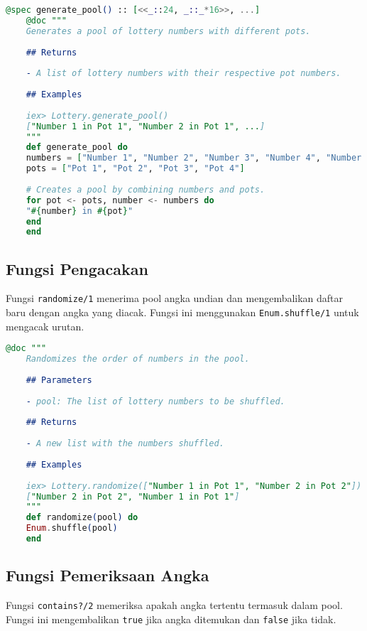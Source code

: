 \begin{lstlisting}[language=elixir, caption={Fungsi Pembentukan Pool}]
	@spec generate_pool() :: [<<_::24, _::_*16>>, ...]
	@doc """
	Generates a pool of lottery numbers with different pots.
	
	## Returns
	
	- A list of lottery numbers with their respective pot numbers.
	
	## Examples
	
	iex> Lottery.generate_pool()
	["Number 1 in Pot 1", "Number 2 in Pot 1", ...]
	"""
	def generate_pool do
	numbers = ["Number 1", "Number 2", "Number 3", "Number 4", "Number 5", "Number 6"]
	pots = ["Pot 1", "Pot 2", "Pot 3", "Pot 4"]
	
	# Creates a pool by combining numbers and pots.
	for pot <- pots, number <- numbers do
	"#{number} in #{pot}"
	end
	end
\end{lstlisting}

\subsection{Fungsi Pengacakan}

Fungsi \texttt{randomize/1} menerima pool angka undian dan mengembalikan daftar baru dengan angka yang diacak. Fungsi ini menggunakan \texttt{Enum.shuffle/1} untuk mengacak urutan.

\begin{lstlisting}[language=elixir, caption={Fungsi Pengacakan}]
	@doc """
	Randomizes the order of numbers in the pool.
	
	## Parameters
	
	- pool: The list of lottery numbers to be shuffled.
	
	## Returns
	
	- A new list with the numbers shuffled.
	
	## Examples
	
	iex> Lottery.randomize(["Number 1 in Pot 1", "Number 2 in Pot 2"])
	["Number 2 in Pot 2", "Number 1 in Pot 1"]
	"""
	def randomize(pool) do
	Enum.shuffle(pool)
	end
\end{lstlisting}

\subsection{Fungsi Pemeriksaan Angka}

Fungsi \texttt{contains?/2} memeriksa apakah angka tertentu termasuk dalam pool. Fungsi ini mengembalikan \texttt{true} jika angka ditemukan dan \texttt{false} jika tidak.

